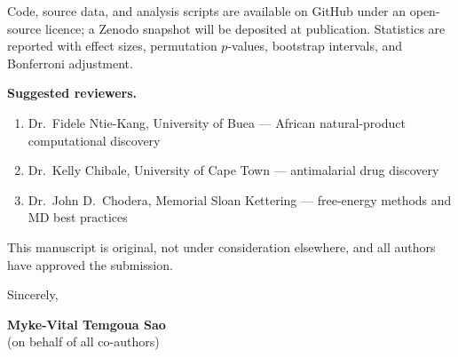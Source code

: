 \documentclass[11pt,letterpaper]{article}
\begin{document}
Code, source data, and analysis scripts are available on GitHub under an open-source licence; a Zenodo snapshot will be deposited at publication. Statistics are reported with effect sizes, permutation $p$-values, bootstrap intervals, and Bonferroni adjustment.

\noindent\textbf{Suggested reviewers.}
\begin{enumerate}
  \item Dr.\ Fidele Ntie-Kang, University of Buea --- African natural-product computational discovery
  \item Dr.\ Kelly Chibale, University of Cape Town --- antimalarial drug discovery
  \item Dr.\ John D.\ Chodera, Memorial Sloan Kettering --- free-energy methods and MD best practices
\end{enumerate}

\noindent This manuscript is original, not under consideration elsewhere, and all authors have approved the submission.

\vspace{1em}

\noindent Sincerely,

\vspace{1em}

\noindent \textbf{Myke-Vital Temgoua Sao} \\
(on behalf of all co-authors)
\end{document}
